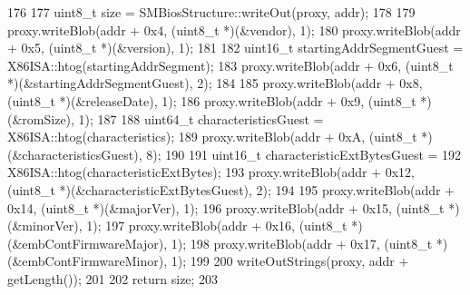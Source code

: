 \begin{DoxyCode}
176 {
177     uint8_t size = SMBiosStructure::writeOut(proxy, addr);
178 
179     proxy.writeBlob(addr + 0x4, (uint8_t *)(&vendor), 1);
180     proxy.writeBlob(addr + 0x5, (uint8_t *)(&version), 1);
181 
182     uint16_t startingAddrSegmentGuest = X86ISA::htog(startingAddrSegment);
183     proxy.writeBlob(addr + 0x6, (uint8_t *)(&startingAddrSegmentGuest), 2);
184 
185     proxy.writeBlob(addr + 0x8, (uint8_t *)(&releaseDate), 1);
186     proxy.writeBlob(addr + 0x9, (uint8_t *)(&romSize), 1);
187 
188     uint64_t characteristicsGuest = X86ISA::htog(characteristics);
189     proxy.writeBlob(addr + 0xA, (uint8_t *)(&characteristicsGuest), 8);
190 
191     uint16_t characteristicExtBytesGuest =
192         X86ISA::htog(characteristicExtBytes);
193     proxy.writeBlob(addr + 0x12, (uint8_t *)(&characteristicExtBytesGuest), 2);
194 
195     proxy.writeBlob(addr + 0x14, (uint8_t *)(&majorVer), 1);
196     proxy.writeBlob(addr + 0x15, (uint8_t *)(&minorVer), 1);
197     proxy.writeBlob(addr + 0x16, (uint8_t *)(&embContFirmwareMajor), 1);
198     proxy.writeBlob(addr + 0x17, (uint8_t *)(&embContFirmwareMinor), 1);
199 
200     writeOutStrings(proxy, addr + getLength());
201 
202     return size;
203 }
\end{DoxyCode}


